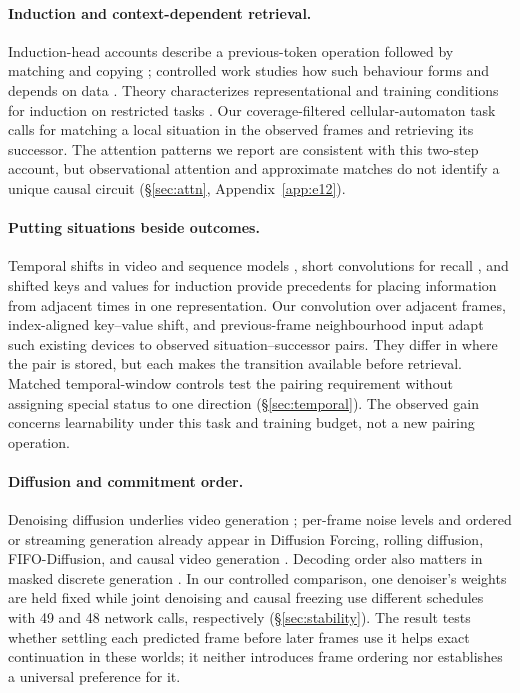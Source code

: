\documentclass[11pt]{article}
\begin{document}
\paragraph{Induction and context-dependent retrieval.}
Induction-head accounts describe a previous-token operation followed by
matching and copying \citep{elhage2021mathematical, olsson2022incontext};
controlled work studies how such behaviour forms and depends on data
\citep{singh2024needs, edelman2024statistical, chan2022data,
reddy2024mechanistic}. Theory characterizes representational and training
conditions for induction on restricted tasks \citep{sanford2024onelayer,
ekbote2025one, nichani2024transformers}. Our coverage-filtered
cellular-automaton task calls for matching a local situation in the observed
frames and retrieving its successor.
The attention patterns we report are consistent with this two-step account,
but observational attention and approximate matches do not identify a unique
causal circuit (\S\ref{sec:attn}, Appendix~\ref{app:e12}).

\paragraph{Putting situations beside outcomes.}
Temporal shifts in video and sequence models \citep{lin2019tsm,
peng2023rwkv}, short convolutions for recall \citep{fu2023hungry,
arora2023zoology}, and shifted keys and values for induction
\citep{xu2024kvshift} provide precedents for placing information from
adjacent times in one representation. Our convolution over adjacent frames,
index-aligned key--value shift, and previous-frame neighbourhood input adapt
such existing devices to observed situation--successor pairs. They differ in
where the pair is stored, but each makes the transition available before
retrieval. Matched temporal-window controls test the pairing requirement
without assigning special status to one direction (\S\ref{sec:temporal}).
The observed gain concerns learnability under this task and training budget,
not a new pairing operation.

\paragraph{Diffusion and commitment order.}
Denoising diffusion underlies video generation
\citep{ho2020denoising, ho2022video}; per-frame noise levels and ordered or
streaming generation already appear in Diffusion Forcing, rolling diffusion,
FIFO-Diffusion, and causal video generation \citep{chen2024diffusion,
ruhe2024rolling, kim2024fifo, yin2024causvid}. Decoding order also matters
in masked discrete generation \citep{kim2025train}. In our controlled
comparison, one denoiser's weights are held fixed while joint denoising and
causal freezing use different schedules with 49 and 48 network calls,
respectively (\S\ref{sec:stability}). The result tests whether settling each
predicted frame before later frames use it helps exact continuation in these
worlds; it neither introduces frame ordering nor establishes a universal
preference for it.
\end{document}
